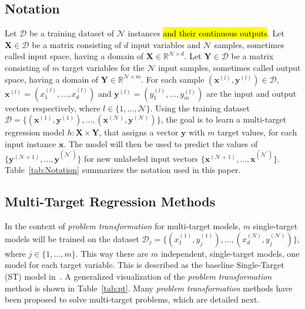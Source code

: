 \documentclass[preprint,12pt]{elsarticle}
\begin{document}
\subsection{Notation}\label{subsec:notation}
Let $\mathcal{D}$ be a training dataset of $\mathcal{N}$ instances \hl{and their continuous outputs}. Let $\bm{X} \in \mathcal{D}$ be a matrix consisting of $d$ input variables and $\mathcal{N}$ samples, sometimes called input space, having a domain of $\bm{X} \in \mathbb{R}^{\mathcal{N} \times d}$. Let $\bm{Y} \in \mathcal{D}$ be a matrix consisting of $m$ target variables for the $\mathcal{N}$ input samples, sometimes called output space, having a domain of $\bm{Y} \in \mathbb{R}^{\mathcal{N} \times m}$. For each sample $(\bm x^{(l)},\bm y^{(l)}) \in \mathcal{D}$, $\bm{x}^{(l)} = (x_1^{(l)}, \ldots, x_d^{(l)})$ and $\bm y^{(l)} = (y_1^{(l)}, \ldots, y_m^{(l)})$ are the input and output vectors respectively, where $l \in \{1, \ldots, \mathcal{N}\}$. Using the training dataset $\mathcal{D} = \{(\bm x^{(1)},\bm y^{(1)}), \ldots, (\bm x^{(\mathcal{N})},\bm y^{(\mathcal{N})})\}$, the goal is to learn a multi-target regression model $h : \bm{X} \times \bm{Y}$, that assigns a vector $\bm{y}$ with $m$ target values, for each input instance $\bm{x}$. The model will then be used to predict the values of $\{\bm{y}^{(\mathcal{N}+1)}, \ldots, \bm{y}^{(\mathcal{N}^\prime)}\}$ for new unlabeled input vectors $\{\bm{x}^{(\mathcal{N}+1)}, \ldots, \bm{x}^{(\mathcal{N}^\prime)}\}$. Table~\ref{tab:Notation} summarizes the notation used in this paper.

\subsection{Multi-Target Regression Methods}\label{subsec:mtr}
In the context of \textit{problem transformation} for multi-target models, $m$ single-target models will be trained on the dataset $\mathcal{D}_j = \{(x_1^{(1)},y_j^{(1)}), \ldots, (x_d^{(N)},y_j^{(\mathcal{N})})\}$, where $j \in \{1, \ldots, m\}$. This way there are $m$ independent, single-target models, one model for each target variable. This is described as the baseline Single-Target (ST) model in~\cite{Spyromitros2014}. A generalized visualization of the \textit{problem transformation} method is shown in Table~\ref{tab:pt}. Many \textit{problem transformation} methods have been proposed to solve multi-target problems, which are detailed next.
\end{document}
